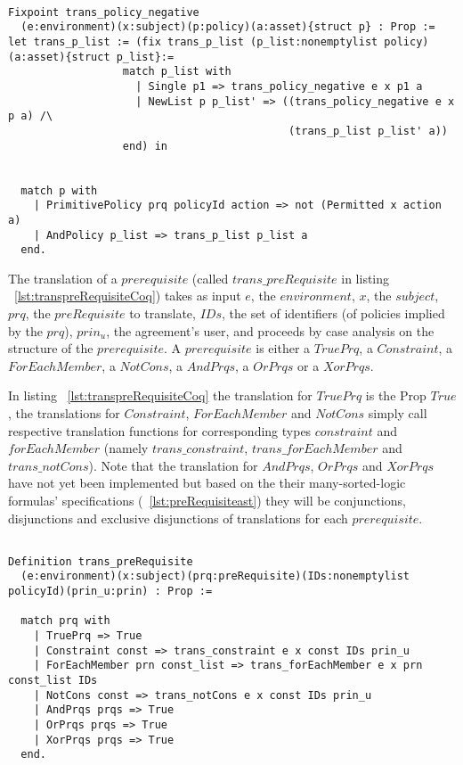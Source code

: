 \begin{minipage}[c]{0.95\textwidth}
\begin{lstlisting}

Fixpoint trans_policy_negative
  (e:environment)(x:subject)(p:policy)(a:asset){struct p} : Prop :=
let trans_p_list := (fix trans_p_list (p_list:nonemptylist policy)(a:asset){struct p_list}:=
                  match p_list with
                    | Single p1 => trans_policy_negative e x p1 a
                    | NewList p p_list' => ((trans_policy_negative e x p a) /\ 
                                            (trans_p_list p_list' a))
                  end) in


  match p with
    | PrimitivePolicy prq policyId action => not (Permitted x action a)
    | AndPolicy p_list => trans_p_list p_list a
  end.
\end{lstlisting}
\end{minipage}

The translation of a $prerequisite$ (called $trans\_preRequisite$ in listing ~\ref{lst:transpreRequisiteCoq}) takes as input $e$, the $environment$, $x$, the $subject$, $prq$, the $preRequisite$ to translate, $IDs$, the set of identifiers (of policies implied by the $prq$), $prin_{u}$, the agreement's user, and proceeds by case analysis on the structure of the $prerequisite$. A $prerequisite$ is either a $TruePrq$, a $Constraint$, a $ForEachMember$, a $NotCons$, a $AndPrqs$, a $OrPrqs$ or a $XorPrqs$. 

In listing ~\ref{lst:transpreRequisiteCoq} the translation for $TruePrq$ is the Prop $True$, the translations for $Constraint$, $ForEachMember$ and $NotCons$ simply call respective translation functions for corresponding types $constraint$ and $forEachMember$ (namely $trans\_constraint$, $trans\_forEachMember$ and $trans\_notCons$). Note that the translation for $AndPrqs$, $OrPrqs$ and $XorPrqs$ have not yet been implemented but based on the their many-sorted-logic formulas' specifications (~\ref{lst:preRequisiteast}) they will be conjunctions, disjunctions and exclusive disjunctions of translations for each $prerequisite$.

\begin{lstlisting}

Definition trans_preRequisite
  (e:environment)(x:subject)(prq:preRequisite)(IDs:nonemptylist policyId)(prin_u:prin) : Prop := 

  match prq with
    | TruePrq => True
    | Constraint const => trans_constraint e x const IDs prin_u 
    | ForEachMember prn const_list => trans_forEachMember e x prn const_list IDs 
    | NotCons const => trans_notCons e x const IDs prin_u 
    | AndPrqs prqs => True 
    | OrPrqs prqs => True 
    | XorPrqs prqs => True 
  end.
\end{lstlisting}

